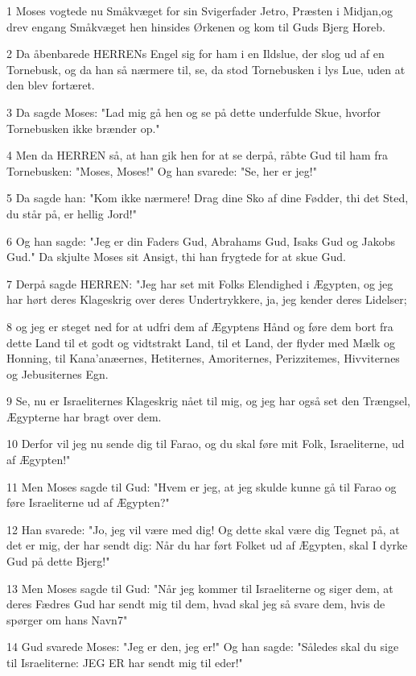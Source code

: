 \par 1 Moses vogtede nu Småkvæget for sin Svigerfader Jetro, Præsten i Midjan,og drev engang Småkvæget hen hinsides Ørkenen og kom til Guds Bjerg Horeb.
\par 2 Da åbenbarede HERRENs Engel sig for ham i en Ildslue, der slog ud af en Tornebusk, og da han så nærmere til, se, da stod Tornebusken i lys Lue, uden at den blev fortæret.
\par 3 Da sagde Moses: "Lad mig gå hen og se på dette underfulde Skue, hvorfor Tornebusken ikke brænder op."
\par 4 Men da HERREN så, at han gik hen for at se derpå, råbte Gud til ham fra Tornebusken: "Moses, Moses!" Og han svarede: "Se, her er jeg!"
\par 5 Da sagde han: "Kom ikke nærmere! Drag dine Sko af dine Fødder, thi det Sted, du står på, er hellig Jord!"
\par 6 Og han sagde: "Jeg er din Faders Gud, Abrahams Gud, Isaks Gud og Jakobs Gud." Da skjulte Moses sit Ansigt, thi han frygtede for at skue Gud.
\par 7 Derpå sagde HERREN: "Jeg har set mit Folks Elendighed i Ægypten, og jeg har hørt deres Klageskrig over deres Undertrykkere, ja, jeg kender deres Lidelser;
\par 8 og jeg er steget ned for at udfri dem af Ægyptens Hånd og føre dem bort fra dette Land til et godt og vidtstrakt Land, til et Land, der flyder med Mælk og Honning, til Kana'anæernes, Hetiternes, Amoriternes, Perizzitemes, Hivviternes og Jebusiternes Egn.
\par 9 Se, nu er Israeliternes Klageskrig nået til mig, og jeg har også set den Trængsel, Ægypterne har bragt over dem.
\par 10 Derfor vil jeg nu sende dig til Farao, og du skal føre mit Folk, Israeliterne, ud af Ægypten!"
\par 11 Men Moses sagde til Gud: "Hvem er jeg, at jeg skulde kunne gå til Farao og føre Israeliterne ud af Ægypten?"
\par 12 Han svarede: "Jo, jeg vil være med dig! Og dette skal være dig Tegnet på, at det er mig, der har sendt dig: Når du har ført Folket ud af Ægypten, skal I dyrke Gud på dette Bjerg!"
\par 13 Men Moses sagde til Gud: "Når jeg kommer til Israeliterne og siger dem, at deres Fædres Gud har sendt mig til dem, hvad skal jeg så svare dem, hvis de spørger om hans Navn7"
\par 14 Gud svarede Moses: "Jeg er den, jeg er!" Og han sagde: "Således skal du sige til Israeliterne: JEG ER har sendt mig til eder!"
